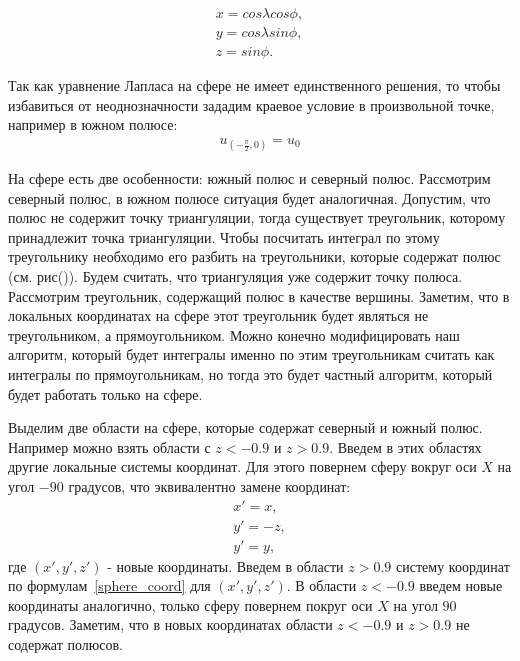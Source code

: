 \documentclass[a4paper,article]{article}
\begin{document}
\begin{equation}\label{sphere_coord}
\begin{split}
x = cos \lambda cos \phi, \\
y = cos \lambda sin \phi, \\
z = sin \phi. 
\end{split}
\end{equation}

Так как уравнение Лапласа на сфере не имеет единственного решения, то
чтобы избавиться от неоднозначности зададим краевое условие в
произвольной точке, например в южном полюсе:
\begin{equation*}
\begin{split}
u_{(-\frac{\pi}{2},0)}=u_0
\end{split}
\end{equation*} 

На сфере есть две особенности: южный полюс и северный
полюс. Рассмотрим северный полюс, в южном полюсе ситуация будет
аналогичная. Допустим, что полюс не содержит точку триангуляции, тогда
существует треугольник, которому принадлежит точка триангуляции. Чтобы
посчитать интеграл по этому треугольнику необходимо его разбить на
треугольники, которые содержат полюс (см. рис()). Будем считать,
что триангуляция уже содержит точку полюса. Рассмотрим треугольник,
содержащий полюс в качестве вершины. Заметим, что в локальных
координатах на сфере этот треугольник будет являться не треугольником,
а прямоугольником. Можно конечно модифицировать наш алгоритм, который
будет интегралы именно по этим треугольникам считать как интегралы по
прямоугольникам, но тогда это будет частный алгоритм, который будет
работать только на сфере. 

Выделим две области на сфере, которые содержат северный и южный
полюс. Например можно взять области с $z<-0.9$ и $z>0.9$. Введем в
этих областях другие локальные системы координат. Для этого повернем сферу
вокруг оси $X$ на угол $-90$ градусов, что эквивалентно замене координат:
\begin{equation*}
\begin{split}
x' = x,\\
y' = -z,\\
y' = y,
\end{split}
\end{equation*}
где $(x',y',z')$ - новые координаты. Введем в области $z>0.9$ систему
координат по формулам~\ref{sphere_coord} для $(x',y',z')$.
В области $z<-0.9$ введем новые координаты аналогично, только сферу
повернем покруг оси $X$ на угол $90$ градусов.
Заметим, что в новых координатах области $z<-0.9$ и $z>0.9$ не
содержат полюсов.
\end{document}
